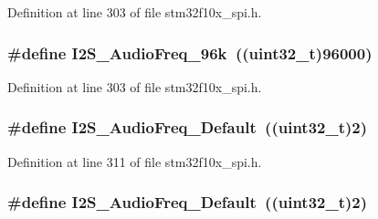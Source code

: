 Definition at line 303 of file stm32f10x\+\_\+spi.\+h.

\subsubsection[{\texorpdfstring{I2\+S\+\_\+\+Audio\+Freq\+\_\+96k}{I2S_AudioFreq_96k}}]{\setlength{\rightskip}{0pt plus 5cm}\#define I2\+S\+\_\+\+Audio\+Freq\+\_\+96k~(({\bf uint32\+\_\+t})96000)}\hypertarget{group___i2_s___audio___frequency_ga5acd02a974e90bb8f2c4e07f8fa0231b}{}\label{group___i2_s___audio___frequency_ga5acd02a974e90bb8f2c4e07f8fa0231b}


Definition at line 303 of file stm32f10x\+\_\+spi.\+h.

\subsubsection[{\texorpdfstring{I2\+S\+\_\+\+Audio\+Freq\+\_\+\+Default}{I2S_AudioFreq_Default}}]{\setlength{\rightskip}{0pt plus 5cm}\#define I2\+S\+\_\+\+Audio\+Freq\+\_\+\+Default~(({\bf uint32\+\_\+t})2)}\hypertarget{group___i2_s___audio___frequency_ga30f78e8214e8a91cdb6d6360c1d3f18d}{}\label{group___i2_s___audio___frequency_ga30f78e8214e8a91cdb6d6360c1d3f18d}


Definition at line 311 of file stm32f10x\+\_\+spi.\+h.

\subsubsection[{\texorpdfstring{I2\+S\+\_\+\+Audio\+Freq\+\_\+\+Default}{I2S_AudioFreq_Default}}]{\setlength{\rightskip}{0pt plus 5cm}\#define I2\+S\+\_\+\+Audio\+Freq\+\_\+\+Default~(({\bf uint32\+\_\+t})2)}\hypertarget{group___i2_s___audio___frequency_ga30f78e8214e8a91cdb6d6360c1d3f18d}{}\label{group___i2_s___audio___frequency_ga30f78e8214e8a91cdb6d6360c1d3f18d}


